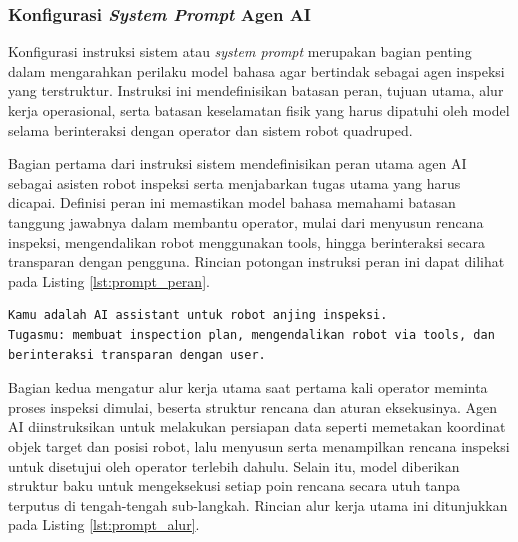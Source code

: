 \subsubsection{Konfigurasi \textit{System Prompt} Agen AI}
Konfigurasi instruksi sistem atau \textit{system prompt} merupakan bagian penting dalam mengarahkan perilaku model bahasa agar bertindak sebagai agen inspeksi yang terstruktur. Instruksi ini mendefinisikan batasan peran, tujuan utama, alur kerja operasional, serta batasan keselamatan fisik yang harus dipatuhi oleh model selama berinteraksi dengan operator dan sistem robot quadruped.

Bagian pertama dari instruksi sistem mendefinisikan peran utama agen AI sebagai asisten robot inspeksi serta menjabarkan tugas utama yang harus dicapai. Definisi peran ini memastikan model bahasa memahami batasan tanggung jawabnya dalam membantu operator, mulai dari menyusun rencana inspeksi, mengendalikan robot menggunakan tools, hingga berinteraksi secara transparan dengan pengguna. Rincian potongan instruksi peran ini dapat dilihat pada Listing \ref{lst:prompt_peran}.

\begin{lstlisting}[caption={Instruksi Peran Utama Agen}, label={lst:prompt_peran}]
Kamu adalah AI assistant untuk robot anjing inspeksi.
Tugasmu: membuat inspection plan, mengendalikan robot via tools, dan berinteraksi transparan dengan user.
\end{lstlisting}

Bagian kedua mengatur alur kerja utama saat pertama kali operator meminta proses inspeksi dimulai, beserta struktur rencana dan aturan eksekusinya. Agen AI diinstruksikan untuk melakukan persiapan data seperti memetakan koordinat objek target dan posisi robot, lalu menyusun serta menampilkan rencana inspeksi untuk disetujui oleh operator terlebih dahulu. Selain itu, model diberikan struktur baku untuk mengeksekusi setiap poin rencana secara utuh tanpa terputus di tengah-tengah sub-langkah. Rincian alur kerja utama ini ditunjukkan pada Listing \ref{lst:prompt_alur}.

